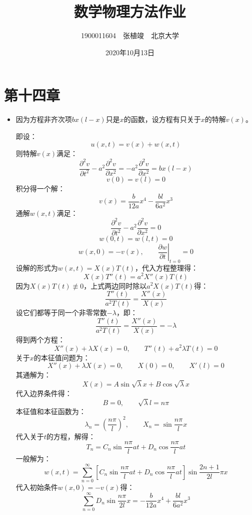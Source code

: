 \documentclass[a4paper,fontset=windows]{ctexart}
\begin{document}
    \title{\textbf{数学物理方法作业}}
    \author{1900011604\ \ 张植竣\ \ 北京大学}
    \date{2020年10月13日}
    \maketitle

    \section*{第十四章}
    \bigskip

    \begin{itemize}

    \item[6.]
    因为方程非齐次项$bx(l-x)$只是$x$的函数，设方程有只关于$x$的特解$v(x)$。

    即设：
    \[
    u(x,t) = v(x) + w(x,t)
    \]
    则特解$v(x)$满足：
    \[
    \frac{\partial^2 v}{\partial t^2} - a^2\frac{\partial^2 v}{\partial x^2} = -a^2\frac{\partial^2 v}{\partial x^2} = bx(l-x)
    \]
    \[
    v(0) = v(l) = 0
    \]
    积分得一个解：
    \[
    v(x) = \frac{b}{12a}x^4 - \frac{bl}{6a^2}x^3
    \]
    通解$w(x,t)$满足：
    \[
    \frac{\partial^2 v}{\partial t^2} - a^2\frac{\partial^2 v}{\partial x^2} = 0
    \]
    \[
    w(0,t) = w(l,t) = 0
    \]
    \[
    w(x,0) = -v(x),\qquad \left.\frac{\partial w}{\partial t}\right|_{t=0} = 0
    \]
    设解的形式为$w(x,t) = X(x)T(t)$，代入方程整理得：
    \[
    X(x)T''(t) = a^2 X''(x)T(t)
    \]
    因为$X(x)T(t) \not\equiv 0$，上式两边同时除以$a^2 X(x)T(t)$得：
    \[
    \frac{T''(t)}{a^2 T(t)} = \frac{X''(x)}{X(x)}
    \]
    设它们都等于同一个非零常数$-\lambda$，即：
    \[
    \frac{T''(t)}{a^2 T(t)} = \frac{X''(x)}{X(x)} = -\lambda
    \]
    得到两个方程：
    \[
    X''(x) + \lambda X(x) = 0,\qquad T''(t) + a^2\lambda T(t) = 0
    \]
    关于$x$的本征值问题为：
    \[
    X''(x) + \lambda X(x) = 0,\qquad X(0) = 0,\qquad X'(l) = 0
    \]
    其通解为：
    \[
    X(x) = A\sin\sqrt{\lambda} x + B\cos\sqrt{\lambda} x
    \]
    代入边界条件得：
    \[
    B = 0,\qquad \sqrt{\lambda} l = n\pi
    \]
    本征值和本征函数为：
    \[
    \lambda_n = \left(\frac{n\pi}{l}\right)^2,\qquad X_n = \sin\frac{n\pi}{l}x
    \]
    代入关于$t$的方程，解得：
    \[
    T_n = C_n\sin\frac{n\pi}{l}at + D_n\cos\frac{n\pi}{l}at
    \]
    一般解为：
    \[
    w(x,t) = \sum_{n=0}^{\infty}\left[C_n\sin\frac{n\pi}{l}at + D_n\cos\frac{n\pi}{l}at\right]\sin\frac{2n+1}{2l}\pi x
    \]
    代入初始条件$w(x,0) = -v(x)$得：
    \[
    \sum_{n=0}^{\infty}D_n\sin\frac{n\pi}{2l}x = -\frac{b}{12a}x^4 + \frac{bl}{6a^2}x^3
\]
\end{itemize}
\end{document}

